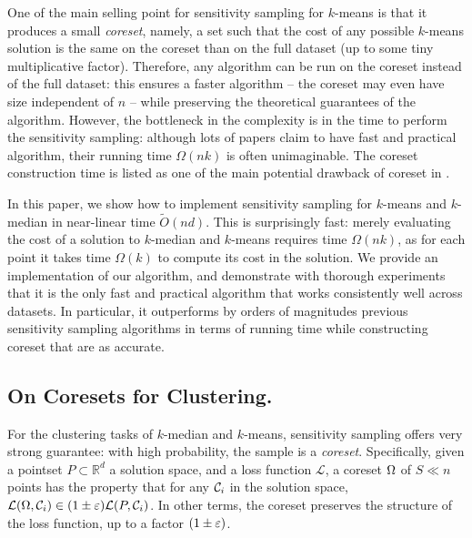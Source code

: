 One of the main selling point for sensitivity sampling for $k$-means is that it produces a small \textit{coreset}, namely, a set such that the cost of any possible $k$-means solution is the same on the coreset than on the full dataset (up to some tiny multiplicative factor).
Therefore, any algorithm can be run on the coreset instead of the full dataset: this ensures a faster algorithm  -- the coreset may even have size independent of $n$ -- while preserving the theoretical guarantees of the algorithm.
However, the bottleneck in the complexity is in the time to perform the sensitivity sampling: although lots of papers claim to have fast and practical algorithm, their running time $\Omega(nk)$ is often 	unimaginable. The coreset construction time is listed as one of the main potential drawback of coreset in \cite{Feldman20}.


In this paper, we show how to implement sensitivity sampling for $k$-means and $k$-median in near-linear time $\tilde O(nd)$.
This is surprisingly fast: merely evaluating the cost of a solution to $k$-median and $k$-means requires time $\Omega(nk)$, as for each point it takes time $\Omega(k)$ to compute its cost in the solution. 
We provide an implementation of our algorithm, and demonstrate with thorough experiments that it is the only fast and practical algorithm that works consistently well across datasets.
In particular, it outperforms by orders of magnitudes previous sensitivity sampling algorithms in terms of running time while constructing coreset that are as accurate. 





\subsection{On Coresets for Clustering.}
For the clustering tasks of $k$-median and $k$-means, sensitivity sampling offers very strong guarantee: with high probability, the sample is a \textit{coreset}.
Specifically, given a pointset $P \subset \mathbb{R}^{d}$
a solution space, and a loss function $\mathcal{L}$, a coreset $\Omega$ of $S \ll n$ points has the property that for any $\mathcal C_i$ in the solution space, $\mathcal{L}(\Omega,
\mathcal C_i) \in (1 \pm \varepsilon) \mathcal{L}(P, \mathcal C_i)$. In other terms, the coreset preserves the structure of the loss function, up to a factor $(1\pm \varepsilon)$.

